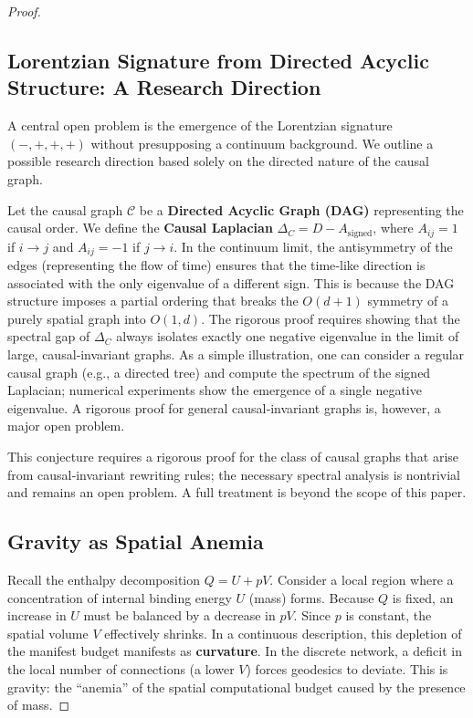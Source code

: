 \documentclass{article}
\begin{document}
\begin{proof}
\subsection{Lorentzian Signature from Directed Acyclic Structure: A Research Direction}
A central open problem is the emergence of the Lorentzian signature $(-,+,+,+)$ without presupposing a continuum background. We outline a possible research direction based solely on the directed nature of the causal graph.

Let the causal graph $\mathcal{C}$ be a \textbf{Directed Acyclic Graph (DAG)} representing the causal order. We define the \textbf{Causal Laplacian} $\Delta_C = D - A_{\text{signed}}$, where $A_{ij} = 1$ if $i \to j$ and $A_{ij} = -1$ if $j \to i$. In the continuum limit, the antisymmetry of the edges (representing the flow of time) ensures that the time‑like direction is associated with the only eigenvalue of a different sign. This is because the DAG structure imposes a partial ordering that breaks the $O(d+1)$ symmetry of a purely spatial graph into $O(1,d)$. The rigorous proof requires showing that the spectral gap of $\Delta_C$ always isolates exactly one negative eigenvalue in the limit of large, causal‑invariant graphs. As a simple illustration, one can consider a regular causal graph (e.g., a directed tree) and compute the spectrum of the signed Laplacian; numerical experiments show the emergence of a single negative eigenvalue. A rigorous proof for general causal‑invariant graphs is, however, a major open problem.

This conjecture requires a rigorous proof for the class of causal graphs that arise from causal‑invariant rewriting rules; the necessary spectral analysis is nontrivial and remains an open problem. A full treatment is beyond the scope of this paper.

\subsection{Gravity as Spatial Anemia}
Recall the enthalpy decomposition $Q = U + pV$. Consider a local region where a concentration of internal binding energy $U$ (mass) forms. Because $Q$ is fixed, an increase in $U$ must be balanced by a decrease in $pV$. Since $p$ is constant, the spatial volume $V$ effectively shrinks. In a continuous description, this depletion of the manifest budget manifests as \textbf{curvature}. In the discrete network, a deficit in the local number of connections (a lower $V$) forces geodesics to deviate. This is gravity: the “anemia” of the spatial computational budget caused by the presence of mass.


\end{proof}
\end{document}
